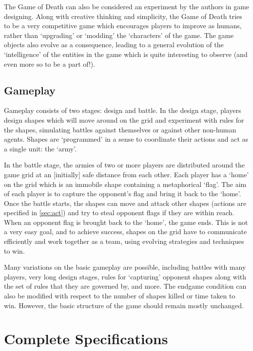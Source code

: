 \documentclass[a4paper,11pt]{article}
\begin{document}
The Game of Death can also be considered an experiment by the authors in game designing. Along with creative thinking and simplicity, the Game of Death tries to be a very competitive game which encourages players to improve as humans, rather than `upgrading' or `modding' the `characters' of the game. The game objects also evolve as a consequence, leading to a general evolution of the `intelligence' of the entities in the game which is quite interesting to observe (and even more so to be a part of!).

\subsection{Gameplay} \label{sec:play}

Gameplay consists of two stages: design and battle. In the design stage, players design shapes which will move around on the grid and experiment with rules for the shapes, simulating battles against themselves or against other non-human agents. Shapes are `programmed' in a sense to coordinate their actions and act as a single unit: the `army'.

In the battle stage, the armies of two or more players are distributed around the game grid at an [initially] safe distance from each other. Each player has a `home' on the grid which is an immobile shape containing a metaphorical `flag'. The aim of each player is to capture the opponent's flag and bring it back to the `home'. Once the battle starts, the shapes can move and attack other shapes (actions are specified in \hyperref[sec:act]{\autoref*{sec:act}}) and try to steal opponent flags if they are within reach. When an opponent flag is brought back to the `home', the game ends. This is not a very easy goal, and to achieve success, shapes on the grid have to communicate efficiently and work together as a team, using evolving strategies and techniques to win.

Many variations on the basic gameplay are possible, including battles with many players, very long design stages, rules for `capturing' opponent shapes along with the set of rules that they are governed by, and more. The endgame condition can also be modified with respect to the number of shapes killed or time taken to win. However, the basic structure of the game should remain mostly unchanged.


\newpage
\section{Complete Specifications}
\end{document}
